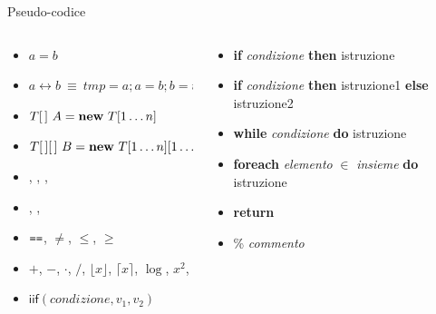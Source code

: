 \begin{frame}{Pseudo-codice}

{\small 
\begin{columns}
\begin{column}{0.485\textwidth}
\begin{itemize}
\item $a = b$
\item $a \leftrightarrow b \ \equiv \ \mathit{tmp} = a; a = b; b = \mathit{tmp}$
\item $T[\,]\ A = \NEW\ T[1 \mldots n]$ \\
\item $T[\,][\,]\ B = \NEW\ T[1 \mldots n][1 \mldots m]$ \\
\item \INTEGER, \REAL, \BOOLEAN, \INTEGER
\item \AND, \OR, \NOT
\item $\operatorname*{\texttt{==}}$, $\neq$, $\leq$, $\geq$
\item $+$, $-$, $\cdot$, $/$, $\lfloor x \rfloor$, $\lceil x \rceil$, $\log$, $x^2$, \mldots
\item $\textsf{iif}(\mathit{condizione}, v_1, v_2)$ 
\end{itemize}
\end{column}
\begin{column}{0.485\textwidth}
\begin{itemize}
\item \textbf{if} \emph{condizione} \textbf{then} istruzione
\item \textbf{if} \emph{condizione} \textbf{then} istruzione1 \textbf{else} istruzione2
\item \textbf{while} \emph{condizione} \textbf{do} istruzione
\item \textbf{foreach} \emph{elemento} $\in$ \emph{insieme} \textbf{do} istruzione
\item \textbf{return}
\item \% \emph{commento}
\end{itemize}
\end{column}
\end{columns}

}
\end{frame}

